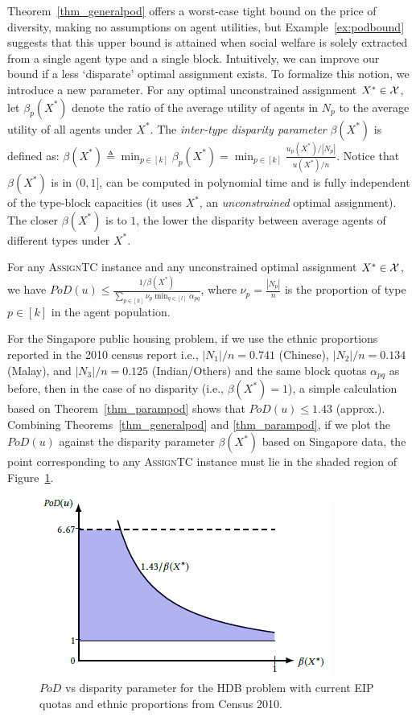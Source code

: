 \documentclass[11pt,dvipdfmx]{article}
\newcommand{\ASTC}{\textsc{AssignTC}\xspace}
\newcommand{\PoD}{\mathit{PoD}}
\begin{document}
Theorem~\ref{thm_generalpod} offers a worst-case tight bound on the price of diversity, making no assumptions on agent utilities, but Example~\ref{ex:podbound} suggests that this upper bound is attained when social welfare is solely extracted from a single agent type and a single block. 
Intuitively, we can improve our bound if a less `disparate' optimal assignment exists. 
To formalize this notion, we introduce a new parameter.
For any optimal unconstrained assignment $X^* \in \cal X$, let $\beta_p(X^*)$ denote the ratio of the average utility of agents in $N_p$ to the average utility of all agents under $X^*$. 
The \emph{inter-type disparity parameter} $\beta(X^*)$ is defined as:
$\beta(X^*) \triangleq \min_{p \in [k]} \beta_p(X^*) = \min_{p \in [k]} \frac{u_p(X^*)/|N_p|}{u(X^*)/n}$.
Notice that $\beta(X^*)$ is in $(0,1]$, can be computed in polynomial time and is fully independent of the type-block capacities (it uses $X^*$, an {\em unconstrained} optimal assignment). The closer $\beta(X^*)$ is to $1$, the lower the disparity between average agents of different types under $X^*$.
\begin{theorem}\label{thm_parampod}
	For any \ASTC instance and any unconstrained optimal assignment $X^* \in \cal X$, we have
	$\PoD(u) \leq \frac{1/\beta(X^*)}{\sum_{p \in [k]} \nu_p \min_{q \in [l]} \alpha_{pq}}$,
	where $\nu_p = \frac{|N_p|}{n}$ is the proportion of type $p \in [k]$ in the agent population.
\end{theorem}
For the Singapore public housing problem, if we use the ethnic proportions reported in the 2010 census report \cite{Sing2010} i.e., $|N_1|/n= 0.741$ (Chinese), $|N_2|/n=0.134$ (Malay), and $|N_3|/n= 0.125$ (Indian/Others) and the same block quotas $\alpha_{pq}$ as before, then in the case of no disparity (i.e., $\beta(X^*) = 1$), a simple calculation based on Theorem~\ref{thm_parampod} shows that 
$\PoD(u) \leq 1.43$ (approx.). Combining Theorems~\ref{thm_generalpod} and \ref{thm_parampod}, if we plot the $\PoD(u)$ against the disparity parameter $\beta(X^*)$ based on Singapore data, the point corresponding to any \ASTC instance must lie in the shaded region of Figure~\ref{fig:PoDbeta}.
\begin{figure}
	\vspace{-15pt}
	\begin{center}
		\includegraphics[scale=0.7]{figs/podbounds.png}
	\end{center}
	\caption{$\PoD$ vs disparity parameter for the HDB problem with current EIP quotas and ethnic proportions from Census 2010.\label{fig:PoDbeta}}
\end{figure}
\end{document}
